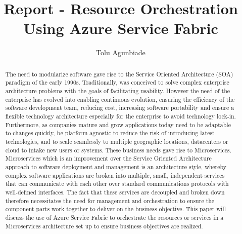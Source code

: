 

\title{Report - Resource Orchestration Using Azure Service Fabric}

\author{Tolu Agunbiade}


\renewcommand{\shortauthors}{T. Agunbiade}


\begin{abstract}
The need to modularize software gave rise to the Service Oriented
Architecture (SOA) paradigm of the early 1990s. Traditionally, was
conceived to solve complex enterprise architecture problems with the
goals of facilitating usability. However the need of the enterprise
has evolved into enabling continuous evolution, ensuring the
efficiency of the software development team, reducing cost, increasing
software portability and ensure a flexible technology architecture
especially for the enterprise to avoid technology
lock-in. Furthermore, as companies mature and grow applications today
need to be adaptable to changes quickly, be platform agnostic to
reduce the risk of introducing latest technologies, and to scale
seamlessly to multiple geographic locations, datacenters or cloud to
intake new users or systems. These business needs gave rise to
Microservices. Microservices which is an improvement over the Service
Oriented Architecture approach to software deployment and management
is an architecture style, whereby complex software applications are
broken into multiple, small, independent services that can communicate
with each other over standard communications protocols with
well-defined interfaces. The fact that these services are decoupled
and broken down therefore necessitates the need for management and
orchestration to ensure the component parts work together to deliver
on the business objective. This paper will discuss the use of Azure
Service Fabric to orchestrate the resources or services in a
Microservices architecture set up to ensure business objectives are
realized.

\end{abstract}



\maketitle


